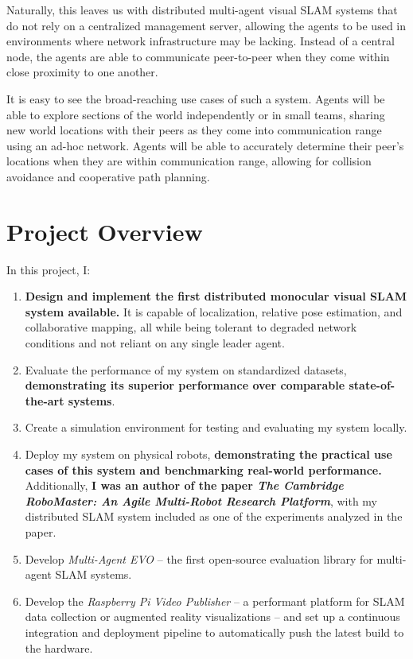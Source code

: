 Naturally, this leaves us with distributed multi-agent visual SLAM systems that do not rely on a centralized management server, allowing the agents to be used in environments where network infrastructure may be lacking. Instead of a central node, the agents are able to communicate peer-to-peer when they come within close proximity to one another.

It is easy to see the broad-reaching use cases of such a system. Agents will be able to explore sections of the world independently or in small teams, sharing new world locations with their peers as they come into communication range using an ad-hoc network. Agents will be able to accurately determine their peer's locations when they are within communication range, allowing for collision avoidance and cooperative path planning.

\section{Project Overview}
\label{sec:project-overview}
In this project, I: \noparskip
{
    \begin{enumerate}
        \item \textbf{Design and implement the first distributed monocular visual SLAM system available.}  It is capable of localization, relative pose estimation, and collaborative mapping, all while being tolerant to degraded network conditions and not reliant on any single leader agent. %
        \item Evaluate the performance of my system on standardized datasets, \textbf{demonstrating its superior performance over comparable state-of-the-art systems}.
        \item Create a simulation environment for testing and evaluating my system locally.
        \item Deploy my system on physical robots, \textbf{demonstrating the practical use cases of this system and benchmarking real-world performance.} Additionally, \textbf{I was an author of the paper \textit{The Cambridge RoboMaster: An Agile Multi-Robot Research Platform}}, with my distributed SLAM system included as one of the experiments analyzed in the paper.
        \item Develop \textit{Multi-Agent EVO} – the first open-source evaluation library for multi-agent SLAM systems.
        \item Develop the \textit{Raspberry Pi Video Publisher} – a performant platform for SLAM data collection or augmented reality visualizations – and set up a continuous integration and deployment pipeline to automatically push the latest build to the hardware.
    \end{enumerate}
}
